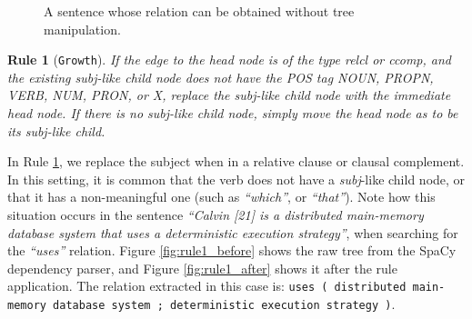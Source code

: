 \documentclass[11pt,a4paper,openright]{memoir}
\newtheorem{treerule}{Rule}
\begin{document}
\begin{figure}[!htbp]

\centering
{}

\caption[A sentence whose relation can be obtained without tree manipulation.]{A sentence whose relation can be obtained without tree manipulation.}
\label{fig:no_rule}
\end{figure}


\begin{treerule}[\texttt{Growth}]
\label{treerule:rule1}
If the edge to the head node is of the type \emph{relcl} or \emph{ccomp}, and the existing \emph{subj}-like child node does not have the POS tag \emph{NOUN}, \emph{PROPN}, \emph{VERB}, \emph{NUM}, \emph{PRON}, or \emph{X}, replace the \emph{subj}-like child node with the immediate head node. If there is no \emph{subj}-like child node, simply move the head node as to be its \emph{subj}-like child.
\end{treerule}

In Rule \ref{treerule:rule1}, we replace the subject when in a relative clause or clausal complement. In this setting, it is common that the verb does not have a \emph{subj}-like child node, or that it has a non-meaningful one (such as \emph{\enquote{which}}, or \emph{\enquote{that}}). Note how this situation occurs in the sentence \emph{\enquote{Calvin [21] is a distributed main-memory database system that uses a deterministic execution strategy}}, when searching for the \emph{\enquote{uses}} relation. Figure \ref{fig:rule1_before} shows the raw tree from the SpaCy dependency parser, and Figure \ref{fig:rule1_after} shows it after the rule application. The relation extracted in this case is: \texttt{uses	( distributed main-memory database system ; deterministic execution strategy )}.
\end{document}
